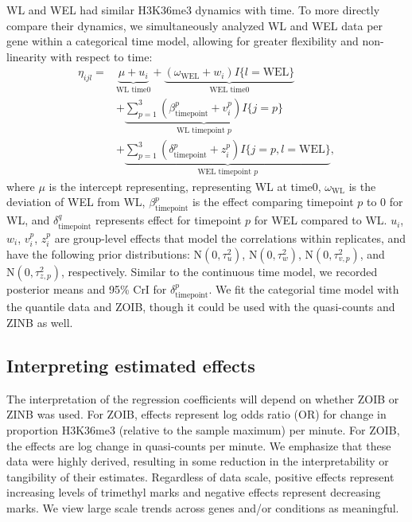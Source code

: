 \documentclass[12pt]{extarticle}
\begin{document}
WL and WEL had similar H3K36me3 dynamics with time. To more directly compare their dynamics, we simultaneously analyzed WL and WEL data per gene within a categorical time model, allowing for greater flexibility and non-linearity with respect to time:
\begin{align}
	\eta_{ijl} = &\underbrace{\mu + u_{i}}_{\text{WL time0}} + \underbrace{(\omega_{\text{WEL}} + w_{i})I\{l = \text{WEL}\}}_{\text{WEL time0}} \\ 
	&+ \underbrace{\sum_{p = 1}^{3}(\beta_{\text{timepoint}}^{p} + v_{i}^{p})I\{j = p\}}_{\text{WL timepoint }p} \nonumber \\ 
	&+ \underbrace{\sum_{p = 1}^{3}(\delta_{\text{timepoint}}^{p} + z_{i}^{p})I\{j = p, l = \text{WEL}\}}_{\text{WEL timepoint }p},\nonumber
\end{align}
where $\mu$ is the intercept representing, representing WL at time0, $\omega_{\text{WL}}$ is the deviation of WEL from WL, $\beta_{\text{timepoint}}^{p}$ is the effect comparing timepoint $p$ to $0$ for WL, and $\delta_{\text{timepoint}}^{q}$ represents effect for timepoint $p$ for WEL compared to WL. $u_{i}$, $w_{i}$, $v_{i}^{p}$, $z_{i}^{p}$ are group-level effects that model the correlations within replicates, and have the following prior distributions: $\text{N}(0, \tau^{2}_{u})$, $\text{N}(0, \tau^{2}_{w})$, $\text{N}(0, \tau^{2}_{v,p})$, and $\text{N}(0, \tau^{2}_{z,p})$, respectively. 
Similar to the continuous time model, we recorded posterior means and 95\% CrI for $\delta_{\text{timepoint}}^{p}$. We fit the categorial time model with the quantile data and ZOIB, though it could be used with the quasi-counts and ZINB as well.

\subsection*{Interpreting estimated effects}

The interpretation of the regression coefficients will depend on whether ZOIB or ZINB was used. For ZOIB, effects represent log odds ratio (OR) for change in proportion H3K36me3 (relative to the sample maximum) per minute. For ZOIB, the effects are log change in quasi-counts per minute. We emphasize that these data were highly derived, resulting in some reduction in the interpretability or tangibility of their estimates. Regardless of data scale, positive effects represent increasing levels of trimethyl marks and negative effects represent decreasing marks. We view large scale trends across genes and/or conditions as meaningful.
\end{document}

